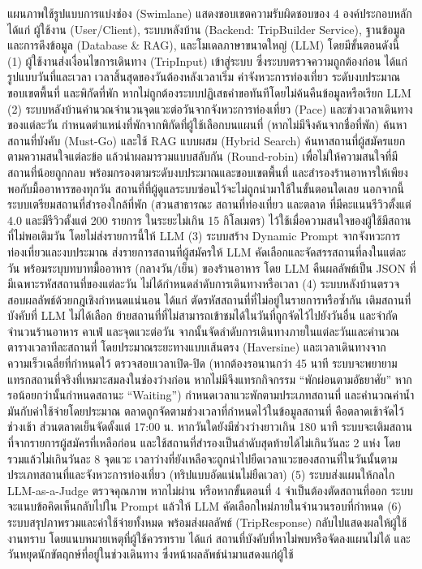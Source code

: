 แผนภาพใช้รูปแบบการแบ่งช่อง (Swimlane) แสดงขอบเขตความรับผิดชอบของ 4 องค์ประกอบหลัก ได้แก่ ผู้ใช้งาน (User/Client), ระบบหลังบ้าน (Backend: TripBuilder Service), ฐานข้อมูลและการดึงข้อมูล (Database \& RAG), และโมเดลภาษาขนาดใหญ่ (LLM) โดยมีขั้นตอนดังนี้ (1) ผู้ใช้งานส่งเงื่อนไขการเดินทาง (TripInput) เข้าสู่ระบบ ซึ่งระบบตรวจความถูกต้องก่อน ได้แก่ รูปแบบวันที่และเวลา เวลาสิ้นสุดของวันต้องหลังเวลาเริ่ม ค่าจังหวะการท่องเที่ยว ระดับงบประมาณ ขอบเขตพื้นที่ และพิกัดที่พัก หากไม่ถูกต้องระบบปฏิเสธคำขอทันทีโดยไม่ค้นคืนข้อมูลหรือเรียก LLM (2) ระบบหลังบ้านคำนวณจำนวนจุดแวะต่อวันจากจังหวะการท่องเที่ยว (Pace) และช่วงเวลาเดินทางของแต่ละวัน กำหนดตำแหน่งที่พักจากพิกัดที่ผู้ใช้เลือกบนแผนที่ (หากไม่มีจึงค้นจากชื่อที่พัก) ค้นหาสถานที่บังคับ (Must-Go) และใช้ RAG แบบผสม (Hybrid Search) ค้นหาสถานที่ผู้สมัครแยกตามความสนใจแต่ละข้อ แล้วนำผลมารวมแบบสลับกัน (Round-robin) เพื่อไม่ให้ความสนใจที่มีสถานที่น้อยถูกกลบ พร้อมกรองตามระดับงบประมาณและขอบเขตพื้นที่ และสำรองร้านอาหารให้เพียงพอกับมื้ออาหารของทุกวัน สถานที่ที่ผู้ดูแลระบบซ่อนไว้จะไม่ถูกนำมาใช้ในขั้นตอนใดเลย นอกจากนี้ระบบเตรียมสถานที่สำรองใกล้ที่พัก (สวนสาธารณะ สถานที่ท่องเที่ยว และตลาด ที่มีคะแนนรีวิวตั้งแต่ 4.0 และมีรีวิวตั้งแต่ 200 รายการ ในระยะไม่เกิน 15 กิโลเมตร) ไว้ใช้เมื่อความสนใจของผู้ใช้มีสถานที่ไม่พอเติมวัน โดยไม่ส่งรายการนี้ให้ LLM (3) ระบบสร้าง Dynamic Prompt จากจังหวะการท่องเที่ยวและงบประมาณ ส่งรายการสถานที่ผู้สมัครให้ LLM คัดเลือกและจัดสรรสถานที่ลงในแต่ละวัน พร้อมระบุบทบาทมื้ออาหาร (กลางวัน/เย็น) ของร้านอาหาร โดย LLM คืนผลลัพธ์เป็น JSON ที่มีเฉพาะรหัสสถานที่ของแต่ละวัน ไม่ได้กำหนดลำดับการเดินทางหรือเวลา (4) ระบบหลังบ้านตรวจสอบผลลัพธ์ด้วยกฎเชิงกำหนดแน่นอน ได้แก่ ตัดรหัสสถานที่ที่ไม่อยู่ในรายการหรือซ้ำกัน เติมสถานที่บังคับที่ LLM ไม่ได้เลือก ย้ายสถานที่ที่ไม่สามารถเข้าชมได้ในวันที่ถูกจัดไว้ไปยังวันอื่น และจำกัดจำนวนร้านอาหาร คาเฟ่ และจุดแวะต่อวัน จากนั้นจัดลำดับการเดินทางภายในแต่ละวันและคำนวณตารางเวลาทีละสถานที่ โดยประมาณระยะทางแบบเส้นตรง (Haversine) และเวลาเดินทางจากความเร็วเฉลี่ยที่กำหนดไว้ ตรวจสอบเวลาเปิด-ปิด (หากต้องรอนานกว่า 45 นาที ระบบจะพยายามแทรกสถานที่จริงที่เหมาะสมลงในช่องว่างก่อน หากไม่มีจึงแทรกกิจกรรม ``พักผ่อนตามอัธยาศัย'' หากรอน้อยกว่านั้นกำหนดสถานะ ``Waiting'') กำหนดเวลาแวะพักตามประเภทสถานที่ และคำนวณค่าน้ำมันกับค่าใช้จ่ายโดยประมาณ ตลาดถูกจัดตามช่วงเวลาที่กำหนดไว้ในข้อมูลสถานที่ คือตลาดเช้าจัดไว้ช่วงเช้า ส่วนตลาดเย็นจัดตั้งแต่ 17:00 น. หากวันใดยังมีช่วงว่างยาวเกิน 180 นาที ระบบจะเติมสถานที่จากรายการผู้สมัครที่เหลือก่อน และใช้สถานที่สำรองเป็นลำดับสุดท้ายได้ไม่เกินวันละ 2 แห่ง โดยรวมแล้วไม่เกินวันละ 8 จุดแวะ เวลาว่างที่ยังเหลือจะถูกนำไปยืดเวลาแวะของสถานที่ในวันนั้นตามประเภทสถานที่และจังหวะการท่องเที่ยว (ทริปแบบอัดแน่นไม่ยืดเวลา) (5) ระบบส่งแผนให้กลไก LLM-as-a-Judge ตรวจคุณภาพ หากไม่ผ่าน หรือหากขั้นตอนที่ 4 จำเป็นต้องตัดสถานที่ออก ระบบจะแนบข้อคิดเห็นกลับไปใน Prompt แล้วให้ LLM คัดเลือกใหม่ภายในจำนวนรอบที่กำหนด (6) ระบบสรุปภาพรวมและค่าใช้จ่ายทั้งหมด พร้อมส่งผลลัพธ์ (TripResponse) กลับไปแสดงผลให้ผู้ใช้งานทราบ โดยแนบหมายเหตุที่ผู้ใช้ควรทราบ ได้แก่ สถานที่บังคับที่หาไม่พบหรือจัดลงแผนไม่ได้ และวันหยุดนักขัตฤกษ์ที่อยู่ในช่วงเดินทาง ซึ่งหน้าผลลัพธ์นำมาแสดงแก่ผู้ใช้

